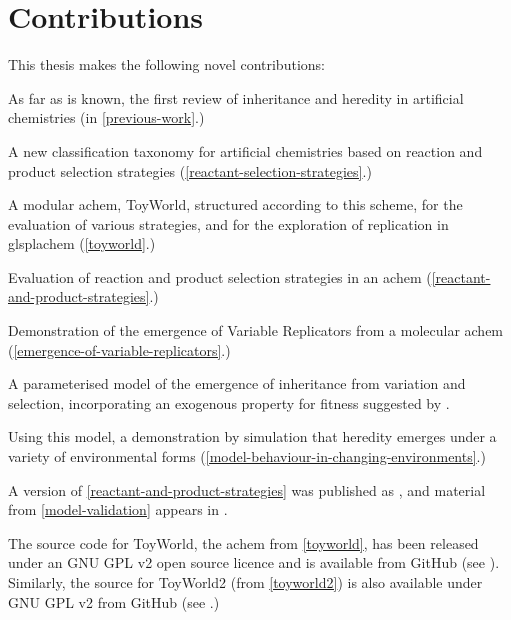 \section{Contributions}\label{contributions}

This thesis makes the following novel contributions:

\begin{compactenum}
\item As far as is known, the first review of inheritance and heredity in artificial chemistries (in \cref{previous-work}.)
\item A new classification taxonomy for artificial chemistries based on reaction and product selection strategies (\cref{reactant-selection-strategies}.)
\item A modular \gls{achem}, ToyWorld, structured according to this scheme, for the evaluation of various strategies, and for the exploration of replication in glspl{achem} (\cref{toyworld}.)
\item Evaluation of reaction and product selection strategies in an \gls{achem} (\cref{reactant-and-product-strategies}.)
\item Demonstration of the emergence of Variable Replicators \parencite{Zachar2010} from a molecular \gls{achem} (\cref{emergence-of-variable-replicators}.)
\item A parameterised model of the emergence of inheritance from variation and selection, incorporating an exogenous property for fitness suggested by \textcite{Bourrat2015}.
\item Using this model, a demonstration by simulation that heredity emerges under a variety of environmental forms (\cref{model-behaviour-in-changing-environments}.)
\end{compactenum}

A version of \cref{reactant-and-product-strategies} was published as \textcite{Young2015}, and material from \cref{model-validation} appears in \textcite{Young2013}.

The source code for ToyWorld, the \gls{achem} from \cref{toyworld}, has been released under an GNU GPL v2 open source licence and is available from GitHub (see \cite{toyworld}). Similarly, the source for ToyWorld2 (from \cref{toyworld2}) is also available under GNU GPL v2 from GitHub (see \cite{toyworld2}.)


